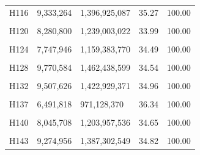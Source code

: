 \documentclass[
  a4paper,
  titlepage]{article}
\begin{document}
\begin{longtable}[t]{lllll}
H116 & 9,333,264 & 1,396,925,087 & 35.27 & 100.00\\
 
\cellcolor{gray!6}{H117} & \cellcolor{gray!6}{10,472,374} & \cellcolor{gray!6}{1,567,560,265} & \cellcolor{gray!6}{34.80} & \cellcolor{gray!6}{100.00}\\
 
H120 & 8,280,800 & 1,239,003,022 & 33.99 & 100.00\\
 
\cellcolor{gray!6}{H121} & \cellcolor{gray!6}{8,976,734} & \cellcolor{gray!6}{1,343,670,342} & \cellcolor{gray!6}{34.77} & \cellcolor{gray!6}{100.00}\\
 
H124 & 7,747,946 & 1,159,383,770 & 34.49 & 100.00\\
 
\cellcolor{gray!6}{H127} & \cellcolor{gray!6}{8,137,924} & \cellcolor{gray!6}{1,217,873,821} & \cellcolor{gray!6}{34.83} & \cellcolor{gray!6}{100.00}\\
 
H128 & 9,770,584 & 1,462,438,599 & 34.54 & 100.00\\
 
\cellcolor{gray!6}{H129} & \cellcolor{gray!6}{6,884,656} & \cellcolor{gray!6}{1,030,023,449} & \cellcolor{gray!6}{34.68} & \cellcolor{gray!6}{100.00}\\
 
H132 & 9,507,626 & 1,422,929,371 & 34.96 & 100.00\\
 
\cellcolor{gray!6}{H135} & \cellcolor{gray!6}{8,081,732} & \cellcolor{gray!6}{1,209,239,802} & \cellcolor{gray!6}{34.55} & \cellcolor{gray!6}{100.00}\\
 
H137 & 6,491,818 & 971,128,370 & 36.34 & 100.00\\
 
\cellcolor{gray!6}{H138} & \cellcolor{gray!6}{9,238,582} & \cellcolor{gray!6}{1,382,335,396} & \cellcolor{gray!6}{34.72} & \cellcolor{gray!6}{100.00}\\
 
H140 & 8,045,708 & 1,203,957,536 & 34.65 & 100.00\\
 
\cellcolor{gray!6}{H142} & \cellcolor{gray!6}{6,247,994} & \cellcolor{gray!6}{934,955,155} & \cellcolor{gray!6}{34.92} & \cellcolor{gray!6}{100.00}\\
 
H143 & 9,274,956 & 1,387,302,549 & 34.82 & 100.00\\
 

\end{longtable}
\end{document}
